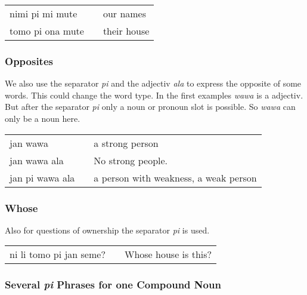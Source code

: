 \begin{supertabular}{p{5,5cm}|ll}
nimi pi mi mute && our names \\
tomo pi ona mute && their house \\
\end{supertabular}  

%
\subsubsection*{Opposites}

We also use the separator \textit{pi} and the adjectiv \textit{ala} to express the opposite of some words. 
This could change the word type. 
In the first examples \textit{wawa} is a adjectiv. 
But after the separator \textit{pi} only a noun or pronoun slot is possible.
So \textit{wawa} can only be a noun here.

\begin{supertabular}{p{5,5cm}|ll}
jan wawa && a strong person \\
jan wawa ala && No strong people. \\ 
jan pi wawa ala && a person with weakness, a weak person \\
\end{supertabular}  

%
\subsubsection*{Whose} 

Also for questions of ownership the separator \textit{pi} is used.

\begin{supertabular}{p{5,5cm}|ll}
ni li tomo pi jan seme? && Whose house is this? \\
\end{supertabular}

%
\subsubsection*{Several \textit{pi} Phrases for one Compound Noun} 

